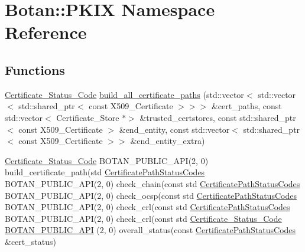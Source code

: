 \hypertarget{namespace_botan_1_1_p_k_i_x}{}\section{Botan\+:\+:P\+K\+IX Namespace Reference}
\label{namespace_botan_1_1_p_k_i_x}
\subsection*{Functions}
\begin{DoxyCompactItemize}
\item 
\mbox{\hyperlink{namespace_botan_ae1e907dc90937bdda30f65216e68ff2b}{Certificate\+\_\+\+Status\+\_\+\+Code}} \mbox{\hyperlink{namespace_botan_1_1_p_k_i_x_a0088a8298180d3f9cfb6a8f1c0cd3253}{build\+\_\+all\+\_\+certificate\+\_\+paths}} (std\+::vector$<$ std\+::vector$<$ std\+::shared\+\_\+ptr$<$ const X509\+\_\+\+Certificate $>$$>$$>$ \&cert\+\_\+paths, const std\+::vector$<$ Certificate\+\_\+\+Store $\ast$$>$ \&trusted\+\_\+certstores, const std\+::shared\+\_\+ptr$<$ const X509\+\_\+\+Certificate $>$ \&end\+\_\+entity, const std\+::vector$<$ std\+::shared\+\_\+ptr$<$ const X509\+\_\+\+Certificate $>$$>$ \&end\+\_\+entity\+\_\+extra)
\item 
\mbox{\hyperlink{namespace_botan_ae1e907dc90937bdda30f65216e68ff2b}{Certificate\+\_\+\+Status\+\_\+\+Code}} B\+O\+T\+A\+N\+\_\+\+P\+U\+B\+L\+I\+C\+\_\+\+A\+PI(2, 0) build\+\_\+certificate\+\_\+path(std \mbox{\hyperlink{namespace_botan_a013252aabcb201e0d27b60b1e690886b}{Certificate\+Path\+Status\+Codes}} B\+O\+T\+A\+N\+\_\+\+P\+U\+B\+L\+I\+C\+\_\+\+A\+PI(2, 0) check\+\_\+chain(const std \mbox{\hyperlink{namespace_botan_a013252aabcb201e0d27b60b1e690886b}{Certificate\+Path\+Status\+Codes}} B\+O\+T\+A\+N\+\_\+\+P\+U\+B\+L\+I\+C\+\_\+\+A\+PI(2, 0) check\+\_\+ocsp(const std \mbox{\hyperlink{namespace_botan_a013252aabcb201e0d27b60b1e690886b}{Certificate\+Path\+Status\+Codes}} B\+O\+T\+A\+N\+\_\+\+P\+U\+B\+L\+I\+C\+\_\+\+A\+PI(2, 0) check\+\_\+crl(const std \mbox{\hyperlink{namespace_botan_a013252aabcb201e0d27b60b1e690886b}{Certificate\+Path\+Status\+Codes}} B\+O\+T\+A\+N\+\_\+\+P\+U\+B\+L\+I\+C\+\_\+\+A\+PI(2, 0) check\+\_\+crl(const std \mbox{\hyperlink{namespace_botan_ae1e907dc90937bdda30f65216e68ff2b}{Certificate\+\_\+\+Status\+\_\+\+Code}} \mbox{\hyperlink{namespace_botan_1_1_p_k_i_x_aa89b961cb12e496c942682134924ad40}{B\+O\+T\+A\+N\+\_\+\+P\+U\+B\+L\+I\+C\+\_\+\+A\+PI}} (2, 0) overall\+\_\+status(const \mbox{\hyperlink{namespace_botan_a013252aabcb201e0d27b60b1e690886b}{Certificate\+Path\+Status\+Codes}} \&cert\+\_\+status)
\end{DoxyCompactItemize}
